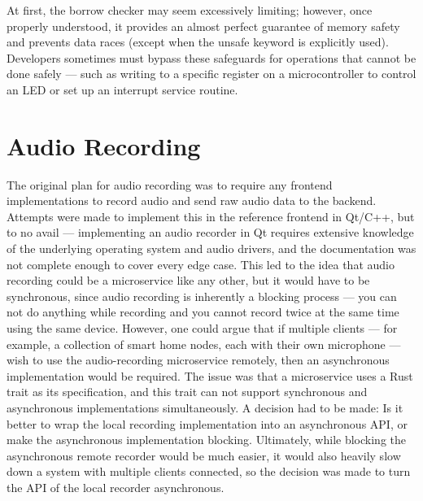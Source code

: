 At first, the borrow checker may seem excessively limiting;
however, once properly understood, it provides an almost perfect guarantee of memory safety
and prevents data races (except when the unsafe keyword is explicitly used).
Developers sometimes must bypass these safeguards for operations that cannot be done safely ---
such as writing to a specific register on a microcontroller to control an LED or set up an interrupt service routine.

\section{Audio Recording}
The original plan for audio recording was to require any frontend implementations to record audio and send raw audio data to the backend.
Attempts were made to implement this in the reference frontend in Qt/C++, but to no avail --- implementing an audio recorder in Qt
requires extensive knowledge of the underlying operating system and audio drivers, and the documentation was not complete enough to cover every edge case.
This led to the idea that audio recording could be a microservice like any other, but it would have to be synchronous, since audio recording
is inherently a blocking process --- you can not do anything while recording and you cannot record twice at the same time using the same device.
However, one could argue that if multiple clients --- for example, a collection of smart home nodes, each with their own microphone ---
wish to use the audio-recording microservice remotely, then an asynchronous implementation would be required.
The issue was that a microservice uses a Rust trait as its specification, and this trait can not support synchronous and asynchronous implementations simultaneously.
A decision had to be made: Is it better to wrap the local recording implementation into an asynchronous API, or make the asynchronous implementation blocking.
Ultimately, while blocking the asynchronous remote recorder would be much easier, it would also heavily slow down a system with multiple clients connected,
so the decision was made to turn the API of the local recorder asynchronous.

